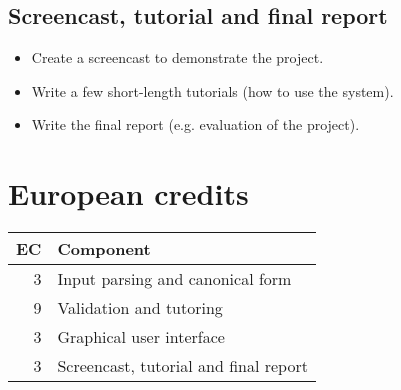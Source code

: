 \documentclass[10pt,a4paper]{article}
\begin{document}
\subsection{Screencast, tutorial and final report}

\begin{itemize}
    \item Create a screencast to demonstrate the project.
    \item Write a few short-length tutorials (how to use the system).
    \item Write the final report (e.g. evaluation of the project).
\end{itemize}

\section{European credits}

\begin{tabular}{rl}
\toprule
EC & Component \\
\midrule
3  & Input parsing and canonical form \\
9  & Validation and tutoring \\
3  & Graphical user interface \\
3  & Screencast, tutorial and final report \\
\bottomrule
\end{tabular}
\end{document}
